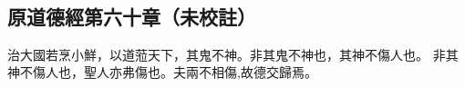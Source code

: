 ﻿%
%

\chapter{~}

\section{原道德經第六十章（未校註）}

\begin{withgezhu}

\zhsong


治大國若烹小鮮，以道蒞天下，其鬼不神。非其鬼不神也，其神不傷人也。
非其神不傷人也，聖人亦弗傷也。夫兩不相傷,故德交歸焉。

\end{withgezhu}
